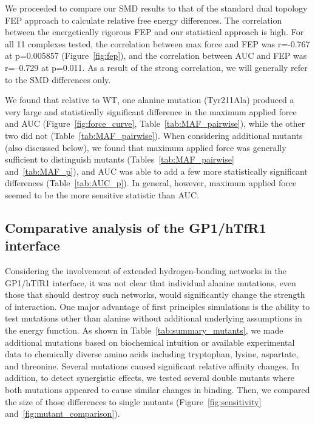 \documentclass[12pt]{article}
\begin{document}
We proceeded to compare our SMD results to that of the standard dual topology FEP approach to calculate relative free energy differences. The correlation between the energetically rigorous FEP and our statistical approach is high. For all 11 complexes tested, the correlation between max force and FEP was r=-0.767 at p=0.005857 (Figure~\ref{fig:fep}), and the correlation between AUC and FEP was r=--0.729 at p=0.011. As a result of the strong correlation, we will generally refer to the SMD differences only.

We found that relative to WT, one alanine mutation (Tyr211Ala) produced a very large and statistically significant difference in the maximum applied force and AUC (Figure~\ref{fig:force_curve}, Table~\ref{tab:MAF_pairwise}), while the other two did not (Table~\ref{tab:MAF_pairwise}). When considering additional mutants (also discussed below), we found that maximum applied force was generally sufficient to distinguish mutants (Tables~\ref{tab:MAF_pairwise} and~\ref{tab:MAF_p}), and AUC was able to add a few more statistically significant differences (Table~\ref{tab:AUC_p}). In general, however, maximum applied force seemed to be the more sensitive statistic than AUC.

\subsection{Comparative analysis of the GP1/hTfR1 interface}
Considering the involvement of extended hydrogen-bonding networks in the GP1/hTfR1 interface, it was not clear that individual alanine mutations, even those that should destroy such networks, would significantly change the strength of interaction. One major advantage of first principles simulations is the ability to test mutations other than alanine without additional underlying assumptions in the energy function. As shown in Table~\ref{tab:summary_mutants}, we made additional mutations based on biochemical intuition or available experimental data to chemically diverse amino acids including tryptophan, lysine, aspartate, and threonine. Several mutations caused significant relative affinity changes. In addition, to detect synergistic effects, we tested several double mutants where both mutations appeared to cause similar changes in binding. Then, we compared the size of those differences to single mutants (Figure~\ref{fig:sensitivity} and~\ref{fig:mutant_comparison}).
\end{document}
